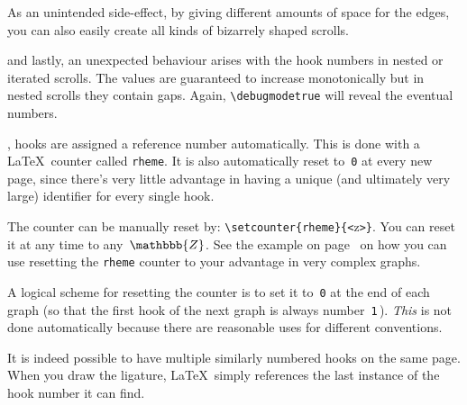 \documentclass[a4paper,justified]{tufte-handout}
\newcommand{\noticeline}[3]%
{\nccurve[linestyle=dotted,dotsep=1pt,linewidth=1pt,linecolor=lightgray,nodesepA=1pt,nodesepB=-2pt,angleA=0,angleB=#1,arrowsize=5pt]{->}{#2}{#3}}
\begin{document}
As an unintended side-effect, by giving different amounts of space for the edges, you can also easily create all kinds of bizarrely shaped scrolls.\noticeline{190}{A}{B}

 and lastly, an unexpected behaviour arises with the hook numbers in nested or iterated scrolls. The values are guaranteed to increase monotonically but in nested scrolls they contain gaps. Again, \texttt{\textbackslash debugmodetrue} will reveal the eventual numbers.\label{hksiniterscrolls}

, hooks are assigned a reference number automatically. This is done with a \LaTeX\ counter called \texttt{rheme}. It is also automatically reset to~\texttt{0} at every new page, since there's very little advantage in having a unique (and ultimately very large) identifier for every single hook.

The counter can be manually reset by: \verb|\setcounter{rheme}{<|{\Fontauri z}\verb|>}|. You can reset it at any time to any~$\mathbbb{Z}$. See the example on page~\pageref{rhemecounter} on how you can use resetting the \texttt{rheme} counter to your advantage in very complex graphs.

A logical scheme for resetting the counter is to set it to~\texttt{0} at the end of each graph (so that the first hook of the next graph is always number~\texttt{1}\,). \textit{This} is not done automatically because there are reasonable uses for different conventions.

It is indeed possible to have multiple similarly numbered hooks on the same page. When you draw the ligature, \LaTeX\ simply references the last instance of the hook number it can find.
\vspace*{1cm}
\end{document}
